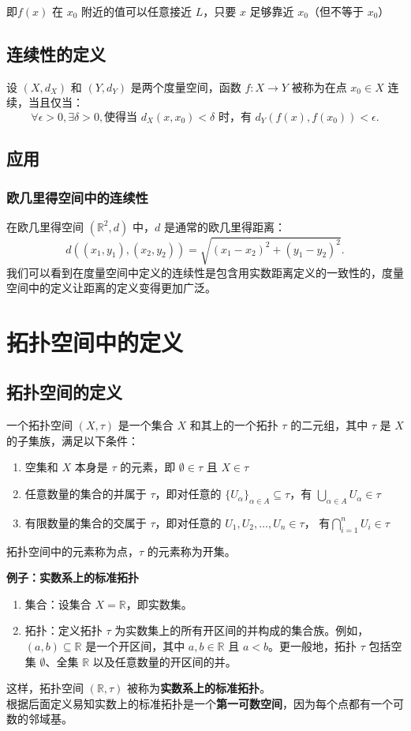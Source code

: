 \documentclass[a4paper, oneside]{article}
\begin{document}
即\( f(x) \) 在 $x_0$ 附近的值可以任意接近 $L$，只要 \( x \) 足够靠近 $x_0$（但不等于 $x_0$）
\subsection{连续性的定义}
设 $(X, d_X)$ 和 $(Y, d_Y)$ 是两个度量空间，函数 $f: X \to Y$ 被称为在点 $x_0 \in X$ 连续，当且仅当：
\[
\forall \epsilon > 0, \exists \delta > 0, \text{使得当 } d_X(x, x_0) < \delta \text{ 时，有 } d_Y(f(x), f(x_0)) < \epsilon.
\]
\subsection{应用}
\subsubsection{欧几里得空间中的连续性}
在欧几里得空间 $(\mathbb{R}^2, d)$ 中，$d$ 是通常的欧几里得距离：
\[
d((x_1, y_1), (x_2, y_2)) = \sqrt{(x_1 - x_2)^2 + (y_1 - y_2)^2}.
\]
我们可以看到在度量空间中定义的连续性是包含用实数距离定义的一致性的，度量空间中的定义让距离的定义变得更加广泛。
\section{拓扑空间中的定义}
\subsection{拓扑空间的定义}
一个拓扑空间 $(X, \tau)$ 是一个集合 $X$ 和其上的一个拓扑 $\tau$ 的二元组，其中 $\tau$ 是 $X$ 的子集族，满足以下条件：
\begin{enumerate}
    \item 空集和 $X$ 本身是 $\tau$ 的元素，即 $\emptyset \in \tau$ 且 $X \in \tau$
    \item 任意数量的集合的并属于 $\tau$，即对任意的 $\{U_\alpha\}_{\alpha \in A} \subseteq \tau$，有 $\bigcup_{\alpha \in A} U_\alpha \in \tau$
    \item 有限数量的集合的交属于 $\tau$，即对任意的 $U_1, U_2, \dots, U_n \in \tau$， 有$\bigcap_{i=1}^n U_i \in \tau$
\end{enumerate}
拓扑空间中的元素称为点，$\tau$ 的元素称为开集。

\textbf{例子：实数系上的标准拓扑}
\begin{enumerate}
    \item 集合：设集合 $X = \mathbb{R}$，即实数集。
    \item 拓扑：定义拓扑 $\tau$ 为实数集上的所有开区间的并构成的集合族。例如，$ (a, b) \subseteq \mathbb{R} $ 是一个开区间，其中 $a, b \in \mathbb{R}$ 且 $a < b$。更一般地，拓扑 $\tau$ 包括空集 $\emptyset$、全集 $\mathbb{R}$ 以及任意数量的开区间的并。
\end{enumerate}
这样，拓扑空间 $(\mathbb{R}, \tau)$ 被称为\textbf{实数系上的标准拓扑}。\\
根据后面定义易知实数上的标准拓扑是一个\textbf{第一可数空间}，因为每个点都有一个可数的邻域基。
\end{document}
